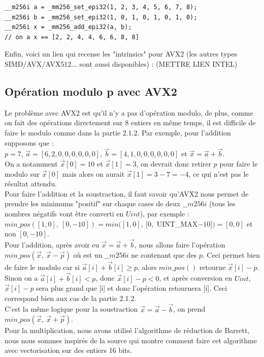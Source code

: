 \documentclass[12pt, a4paper]{article}
\begin{document}
\begin{lstlisting}
__m256i a = _mm256_set_epi32(1, 2, 3, 4, 5, 6, 7, 8);
__m256i b = _mm256_set_epi32(1, 0, 1, 0, 1, 0, 1, 0);
__m256i x = _mm256_add_epi32(a, b);
// on a x == [2, 2, 4, 4, 6, 6, 8, 8]
\end{lstlisting}
Enfin, voici un lien qui recense les "intrinsics" pour AVX2 (les autres types SIMD/AVX/AVX512... sont aussi disponibles) : (METTRE LIEN INTEL)

\subsection{Opération modulo p avec AVX2}

Le problème avec AVX2 est qu'il n'y a pas d'opération modulo, de plus, comme on fait des opérations directement sur 8 entiers en même temps, il est difficile de faire le modulo comme dans la partie 2.1.2.
Par exemple, pour l'addition supposons que : \\
$p = 7$, $\overrightarrow{a} = [6, 2, 0, 0, 0, 0, 0, 0]$, $\overrightarrow{b} = [4, 1, 0, 0, 0, 0, 0, 0]$ et $\overrightarrow{x} = \overrightarrow{a}+\overrightarrow{b}$. \\
On a notamment $\overrightarrow{x}[0] = 10$ et $\overrightarrow{x}[1] = 3$, on devrait donc retirer $p$ pour faire le modulo sur $\overrightarrow{x}[0]$ mais alors on aurait $\overrightarrow{x}[1] = 3-7 = -4$, ce qui n'est pas le résultat attendu.\\ 
\indent Pour faire l'addition et la soustraction, il faut savoir qu'AVX2 nous permet de prendre les minimums "positif" sur chaque cases de deux $\_\_m256i$ (tous les nombres négatifs vont être converti en $Uint$), par exemple :\\ $min\_pos([1, 0],\  [0, -10]) = min([1, 0], \ [0,$ UINT\_MAX$-10]) = [0, 0]$ et non $[0, -10]$. \\
\indent Pour l'addition, après avoir eu $\overrightarrow{x} = \overrightarrow{a}+\overrightarrow{b}$, nous allons faire l'opération $min\_pos(\overrightarrow{x},\ \overrightarrow{x}-\overrightarrow{p})$ où  est un $\_\_m256i$ ne contenant que des $p$. Ceci permet bien de faire le modulo car si $\overrightarrow{a}[i] + \overrightarrow{b}[i] \geq p$, alors $min\_pos()$ retourne $\overrightarrow{x}[i] - p$. Sinon on a $\overrightarrow{a}[i] + \overrightarrow{b}[i] < p$, donc $\overrightarrow{x}[i]-p < 0$, et après conversion en $Uint$, $\overrightarrow{x}[i]-p$ sera plus grand que [i] et donc l'opération retournera [i]. Ceci correspond bien aux cas de la partie 2.1.2. \\
C'est la même logique pour la soustraction $\overrightarrow{x} = \overrightarrow{a}-\overrightarrow{b}$, on prend $min\_pos(\overrightarrow{x},\ \overrightarrow{x}+\overrightarrow{p})$. \\
\indent Pour la multiplication, nous avons utilisé l'algorithme de réduction de Barrett, nous nous sommes inspirés de la source \cite{SIMD} qui montre comment faire cet algorithme avec vectorisation sur des entiers 16 bits.
\end{document}
